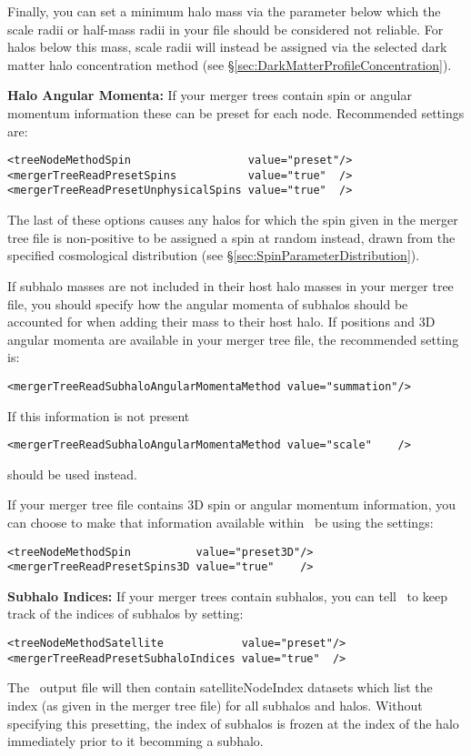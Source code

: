 Finally, you can set a minimum halo mass via the {\normalfont \ttfamily [mergerTreeReadPresetScaleRadiiMinimumMass]} parameter below which the scale radii or half-mass radii in your file should be considered not reliable. For halos below this mass, scale radii will instead be assigned via the selected dark matter halo concentration method (see \S\ref{sec:DarkMatterProfileConcentration}).

{\bf Halo Angular Momenta:} If your merger trees contain spin or angular momentum information these can be preset for each node. Recommended settings are:
\begin{verbatim}
<treeNodeMethodSpin                  value="preset"/>
<mergerTreeReadPresetSpins           value="true"  />
<mergerTreeReadPresetUnphysicalSpins value="true"  />
\end{verbatim}
The last of these options causes any halos for which the spin given in the merger tree file is non-positive to be assigned a spin at random instead, drawn from the specified cosmological distribution (see \S\ref{sec:SpinParameterDistribution}).

If subhalo masses are not included in their host halo masses in your merger tree file, you should specify how the angular momenta of subhalos should be accounted for when adding their mass to their host halo. If positions and 3D angular momenta are available in your merger tree file, the recommended setting is:
\begin{verbatim}
<mergerTreeReadSubhaloAngularMomentaMethod value="summation"/>
\end{verbatim}
If this information is not present 
\begin{verbatim}
<mergerTreeReadSubhaloAngularMomentaMethod value="scale"    />
\end{verbatim}
should be used instead.

If your merger tree file contains 3D spin or angular momentum information, you can choose to make that information available within \glc\ be using the settings:
\begin{verbatim}
<treeNodeMethodSpin          value="preset3D"/>
<mergerTreeReadPresetSpins3D value="true"    />
\end{verbatim}

{\bf Subhalo Indices:} If your merger trees contain subhalos, you can tell \glc\ to keep track of the indices of subhalos by setting:
\begin{verbatim}
<treeNodeMethodSatellite            value="preset"/>
<mergerTreeReadPresetSubhaloIndices value="true"  />
\end{verbatim}
The \glc\ output file will then contain {\normalfont \ttfamily satelliteNodeIndex} datasets which list the index (as given in the merger tree file) for all subhalos and halos. Without specifying this presetting, the index of subhalos is frozen at the index of the halo immediately prior to it becomming a subhalo.

